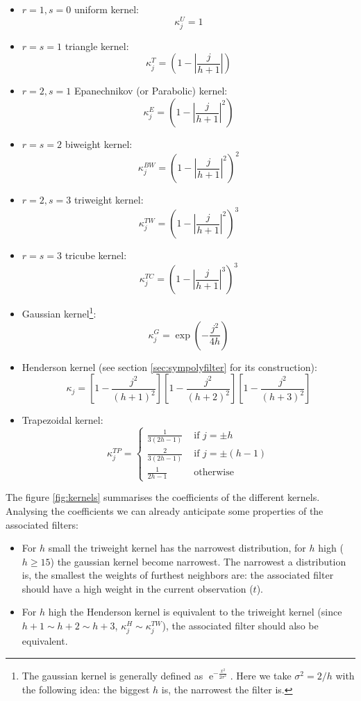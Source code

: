 \documentclass[
  12pt,
  ,
  a4paper]{article}
\DeclareMathOperator{\e}{e}
\newcommand\1{\mathds{1}}
\begin{document}
\begin{multicols}{2}
\begin{itemize}
\item $r=1,s=0$ uniform kernel: 
$$\kappa_j^U=1$$
\item $r=s=1$ triangle kernel:
$$\kappa_j^T=\left(
  1-
  \left\lvert
  \frac j {h+1}
  \right\lvert
\right)$$

\item $r=2,s=1$  Epanechnikov (or Parabolic) kernel:
$$\kappa_j^E=\left(
  1-
  \left\lvert
  \frac j {h+1}
  \right\lvert^2
\right)$$

\item $r=s=2$ biweight kernel:
$$\kappa_j^{BW}=\left(
  1-
  \left\lvert
  \frac j {h+1}
  \right\lvert^2
\right)^2$$

\item $r = 2, s = 3$ triweight kernel:
$$\kappa_j^{TW}=\left(
  1-
  \left\lvert
  \frac j {h+1}
  \right\lvert^2
\right)^3$$

\item $r = s = 3$ tricube kernel:
$$\kappa_j^{TC}=\left(
  1-
  \left\lvert
  \frac j {h+1}
  \right\lvert^3
\right)^3$$

\item Gaussian kernel\footnote{
The gaussian kernel is generally defined as $\e^{-\frac{ x^2}{ 2\sigma^2}}$.
Here we take $\sigma^2=2/h$ with the following idea: the biggest $h$ is, the narrowest the filter is.
}:
$$
\kappa_j^G=\exp\left(
-\frac{
  j^2
}{
  4h
}\right)
$$
\item Henderson kernel (see section \ref{sec:sympolyfilter} for its construction):
$$
\kappa_{j}=\left[1-\frac{j^2}{(h+1)^2}\right]
\left[1-\frac{j^2}{(h+2)^2}\right]
\left[1-\frac{j^2}{(h+3)^2}\right]
$$
\item Trapezoidal kernel:
$$
\kappa_j^{TP}=
\begin{cases}
  \frac{1}{3(2h-1)} & \text{ if }j=\pm h 
  \\
  \frac{2}{3(2h-1)} & \text{ if }j=\pm (h-1)\\
  \frac{1}{2h-1}& \text{ otherwise}
\end{cases}
$$
\end{itemize}
\end{multicols}

The figure \ref{fig:kernels} summarises the coefficients of the different kernels.
Analysing the coefficients we can already anticipate some properties of the associated filters:

\begin{itemize}
\item
  For \(h\) small the triweight kernel has the narrowest distribution, for \(h\) high (\(h\geq15\)) the gaussian kernel become narrowest.
  The narrowest a distribution is, the smallest the weights of furthest neighbors are: the associated filter should have a high weight in the current observation (\(t\)).
\item
  For \(h\) high the Henderson kernel is equivalent to the triweight kernel (since \(h+1\sim h+2 \sim h+3\), \(\kappa_j^H\sim\kappa_j^{TW}\)), the associated filter should also be equivalent.
\end{itemize}
\end{document}
